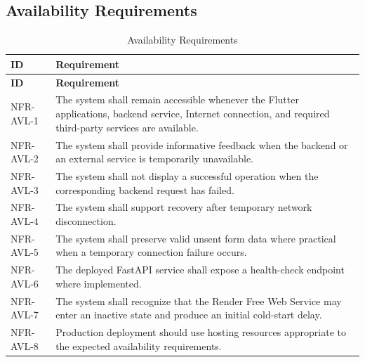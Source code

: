 \subsection{Availability Requirements}
\begin{longtable}{@{}p{2.6cm}p{10.8cm}@{}}
\caption{Availability Requirements} \label{tab:nfr-avl} \\
\toprule \textbf{ID} & \textbf{Requirement} \\ \midrule
\endfirsthead
\toprule \textbf{ID} & \textbf{Requirement} \\ \midrule
\endhead
NFR-AVL-1 & The system shall remain accessible whenever the Flutter applications, backend service, Internet connection, and required third-party services are available. \\
NFR-AVL-2 & The system shall provide informative feedback when the backend or an external service is temporarily unavailable. \\
NFR-AVL-3 & The system shall not display a successful operation when the corresponding backend request has failed. \\
NFR-AVL-4 & The system shall support recovery after temporary network disconnection. \\
NFR-AVL-5 & The system shall preserve valid unsent form data where practical when a temporary connection failure occurs. \\
NFR-AVL-6 & The deployed FastAPI service shall expose a health-check endpoint where implemented. \\
NFR-AVL-7 & The system shall recognize that the Render Free Web Service may enter an inactive state and produce an initial cold-start delay. \\
NFR-AVL-8 & Production deployment should use hosting resources appropriate to the expected availability requirements. \\
\bottomrule
\end{longtable}

